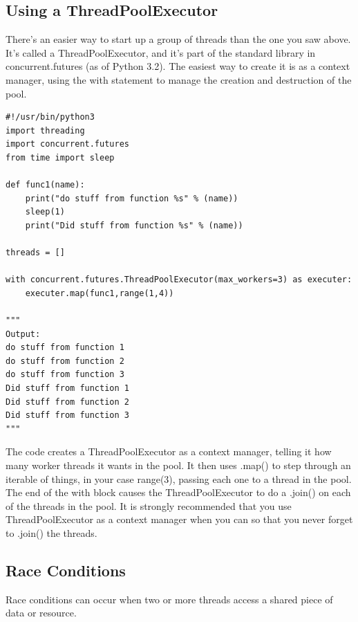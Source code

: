 \documentclass{report}
\begin{document}
    \subsection{Using a ThreadPoolExecutor}
    \bigbreak \noindent 
    There’s an easier way to start up a group of threads than the one you saw above. It’s called a ThreadPoolExecutor, and it’s part of the standard library in concurrent.futures (as of Python 3.2).
    \bigbreak \noindent 
    The easiest way to create it is as a context manager, using the with statement to manage the creation and destruction of the pool.
    \begin{mdframed}
        \begin{verbatim}
#!/usr/bin/python3
import threading
import concurrent.futures
from time import sleep

def func1(name):
    print("do stuff from function %s" % (name))
    sleep(1)
    print("Did stuff from function %s" % (name))

threads = []

with concurrent.futures.ThreadPoolExecutor(max_workers=3) as executer:
    executer.map(func1,range(1,4))

"""
Output:
do stuff from function 1
do stuff from function 2
do stuff from function 3
Did stuff from function 1
Did stuff from function 2
Did stuff from function 3
"""
        \end{verbatim}
    \end{mdframed}
    \bigbreak \noindent 
    The code creates a ThreadPoolExecutor as a context manager, telling it how many worker threads it wants in the pool. It then uses .map() to step through an iterable of things, in your case range(3), passing each one to a thread in the pool.
    \bigbreak \noindent 
    The end of the with block causes the ThreadPoolExecutor to do a .join() on each of the threads in the pool. It is strongly recommended that you use ThreadPoolExecutor as a context manager when you can so that you never forget to .join() the threads.

    \bigbreak \noindent \bigbreak \noindent 
    \subsection{Race Conditions}
    \bigbreak \noindent 
    Race conditions can occur when two or more threads access a shared piece of data or resource.

    \pagebreak \bigbreak \noindent 
\end{document}
